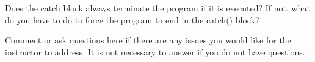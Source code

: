 \documentclass[letterpaper,12pt]{exam}
\begin{document}
\begin{questions}
\begin{samepage}
    \question Does the catch block always terminate the program if it is executed?  If not, what do you have to do to force the program to end in the catch() block?
    \vspace{5mm}
\end{samepage}



\begin{samepage}
	\question Comment or ask questions here if there are any issues you would like for the instructor to address.  It is not necessary to answer if you do not have questions.
	\vspace{30mm}
\end{samepage}

\end{questions}
\end{document}
